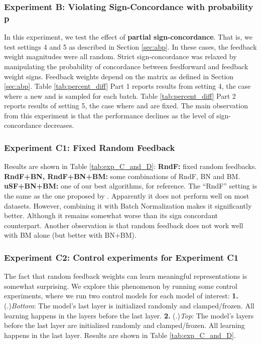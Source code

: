 \documentclass[letterpaper]{article}
\begin{document}
\subsubsection{Experiment B: Violating Sign-Concordance with probability p} 

In this experiment, we test  the effect of \textbf{partial sign-concordance}. That is, we test settings 4 and 5 as described in Section \ref{sec:abp}.  In these cases, the feedback weight magnitudes were all random. Strict sign-concordance was relaxed by manipulating the probability  of concordance between feedforward and feedback weight signs. Feedback weights  depend on the matrix  as defined in Section \ref{sec:abp}. Table \ref{tab:percent_diff} Part 1 reports results from setting 4, the case where a new  and  is sampled for each batch. Table \ref{tab:percent_diff} Part 2 reports results of setting 5, the case where  and  are fixed. The main observation from this experiment is that the performance declines as the level of sign-concordance decreases. 


\subsubsection{Experiment C1: Fixed Random Feedback } 

 Results are shown in Table \ref{tab:exp_C_and_D}: \textbf{RndF:} fixed random feedbacks. \textbf{RndF+BN, RndF+BN+BM:} some combinations of RndF, BN and BM. \textbf{uSF+BN+BM:} one of our best algorithms, for reference. The ``RndF'' setting is the same as the one proposed by \cite{lillicrap2014random}. Apparently it does not perform well on most datasets. However, combining it with Batch Normalization makes it significantly better. Although it remains  somewhat worse than its sign concordant counterpart. Another observation is that random feedback does not work well with BM alone (but better with BN+BM).


\subsubsection{Experiment C2: Control experiments for Experiment C1} 

 The fact that random feedback weights can learn meaningful representations is somewhat surprising. We explore this phenomenon by running some control experiments, where we run two control models for each model of interest: \textbf{1.} (.)\textit{Bottom}: The model's last layer is initialized randomly and clamped/frozen. All learning happens in the layers before the last layer.  \textbf{2.} (.)\textit{Top}: The model's layers before the last layer are initialized randomly and clamped/frozen. All learning happens in the last layer. Results are shown in Table \ref{tab:exp_C_and_D}.
\end{document}
